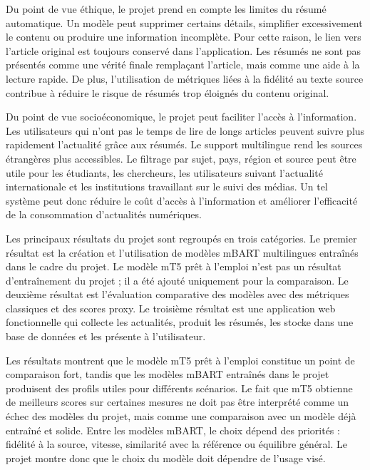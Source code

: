 Du point de vue éthique, le projet prend en compte les limites du résumé automatique. Un modèle peut supprimer certains détails, simplifier excessivement le contenu ou produire une information incomplète. Pour cette raison, le lien vers l’article original est toujours conservé dans l’application. Les résumés ne sont pas présentés comme une vérité finale remplaçant l’article, mais comme une aide à la lecture rapide. De plus, l’utilisation de métriques liées à la fidélité au texte source contribue à réduire le risque de résumés trop éloignés du contenu original.

Du point de vue socioéconomique, le projet peut faciliter l’accès à l’information. Les utilisateurs qui n’ont pas le temps de lire de longs articles peuvent suivre plus rapidement l’actualité grâce aux résumés. Le support multilingue rend les sources étrangères plus accessibles. Le filtrage par sujet, pays, région et source peut être utile pour les étudiants, les chercheurs, les utilisateurs suivant l’actualité internationale et les institutions travaillant sur le suivi des médias. Un tel système peut donc réduire le coût d’accès à l’information et améliorer l’efficacité de la consommation d’actualités numériques.

Les principaux résultats du projet sont regroupés en trois catégories. Le premier résultat est la création et l’utilisation de modèles mBART multilingues entraînés dans le cadre du projet. Le modèle mT5 prêt à l’emploi n’est pas un résultat d’entraînement du projet ; il a été ajouté uniquement pour la comparaison. Le deuxième résultat est l’évaluation comparative des modèles avec des métriques classiques et des scores proxy. Le troisième résultat est une application web fonctionnelle qui collecte les actualités, produit les résumés, les stocke dans une base de données et les présente à l’utilisateur.

Les résultats montrent que le modèle mT5 prêt à l’emploi constitue un point de comparaison fort, tandis que les modèles mBART entraînés dans le projet produisent des profils utiles pour différents scénarios. Le fait que mT5 obtienne de meilleurs scores sur certaines mesures ne doit pas être interprété comme un échec des modèles du projet, mais comme une comparaison avec un modèle déjà entraîné et solide. Entre les modèles mBART, le choix dépend des priorités : fidélité à la source, vitesse, similarité avec la référence ou équilibre général. Le projet montre donc que le choix du modèle doit dépendre de l’usage visé.

